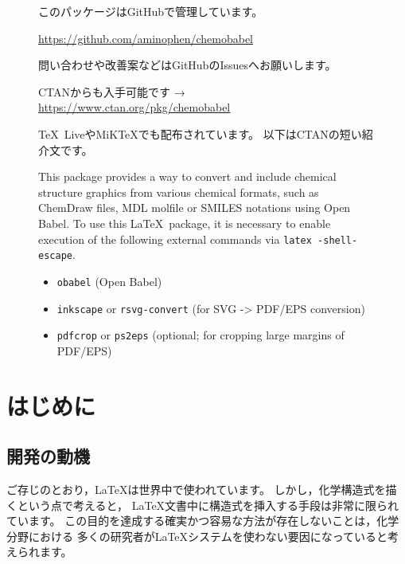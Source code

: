 \documentclass[12pt]{ltjsarticle}
\def\Lcode#1{\texttt{#1}}
\begin{document}
\begin{figure}[ht]
\centering
このパッケージはGitHubで管理しています。\par
\url{https://github.com/aminophen/chemobabel}\par
問い合わせや改善案などはGitHubのIssuesへお願いします。
\end{figure}

\begin{figure}[ht]
\centering
CTANからも入手可能です →
\url{https://www.ctan.org/pkg/chemobabel}\par
\TeX\ LiveやMiK\TeX でも配布されています。
以下はCTANの短い紹介文です。\par
\begin{screen}
This package provides a way to convert and include
chemical structure graphics from various chemical formats,
such as ChemDraw files, MDL molfile or SMILES notations
using Open Babel.
To use this \LaTeX\ package, it is necessary to enable execution
of the following external commands via \Lcode{latex -shell-escape}.
\begin{itemize}
 \item \Lcode{obabel} (Open Babel)
 \item \Lcode{inkscape} or \Lcode{rsvg-convert}
   (for SVG -> PDF/EPS conversion)
 \item \Lcode{pdfcrop} or \Lcode{ps2eps}
   (optional; for cropping large margins of PDF/EPS)
\end{itemize}
\end{screen}
\end{figure}

\clearpage
\setcounter{tocdepth}{3}
\tableofcontents

\clearpage
{}

\section{はじめに}

\subsection{開発の動機}

ご存じのとおり，\LaTeX は世界中で使われています。
しかし，化学構造式を描くという点で考えると，
\LaTeX 文書中に構造式を挿入する手段は非常に限られています。
この目的を達成する確実かつ容易な方法が存在しないことは，化学分野における
多くの研究者が\LaTeX システムを使わない要因になっていると考えられます。
\end{document}

